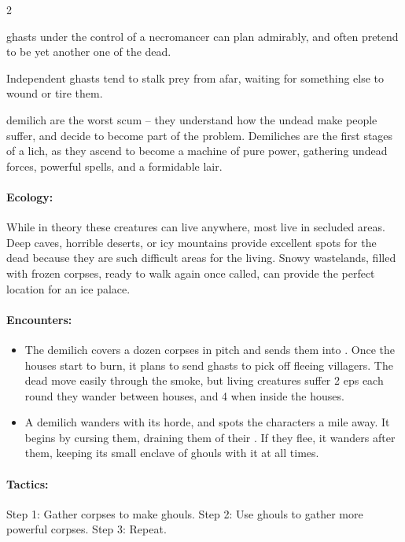 \begin{multicols}{2}

\Glspl{ghast} under the control of a necromancer can plan admirably, and often pretend to be yet another one of the dead.

Independent \glspl{ghast} tend to stalk prey from afar, waiting for something else to wound or tire them.

  {demilich}%
are the worst scum -- they understand how the undead make people suffer, and decide to become part of the problem.
Demiliches are the first stages of a lich, as they ascend to become a machine of pure power, gathering undead forces, powerful spells, and a formidable lair.

\paragraph{Ecology:} While in theory these creatures can live anywhere, most live in secluded areas.
Deep caves, horrible deserts, or icy mountains provide excellent spots for the dead because they are such difficult areas for the living.
Snowy wastelands, filled with frozen corpses, ready to walk again once called, can provide the perfect location for an ice palace.

\paragraph{Encounters:}

\begin{itemize}
  \item
  The demilich covers a dozen corpses in pitch and sends them into .
  Once the houses start to burn, it plans to send \glspl{ghast} to pick off fleeing villagers.
  The dead move easily through the smoke, but living creatures suffer 2 \glspl{ep} each round they wander between houses, and 4 when inside the houses.
  \item
  A demilich wanders with its horde, and spots the characters a mile away.
  It begins by cursing them, draining them of their .
  If they flee, it wanders after them, keeping its small enclave of \glspl{ghoul} with it at all times.

\end{itemize}

\paragraph{Tactics:}
Step 1: Gather corpses to make \glspl{ghoul}.
Step 2: Use \glspl{ghoul} to gather more powerful corpses.
Step 3: Repeat.


\end{multicols}
